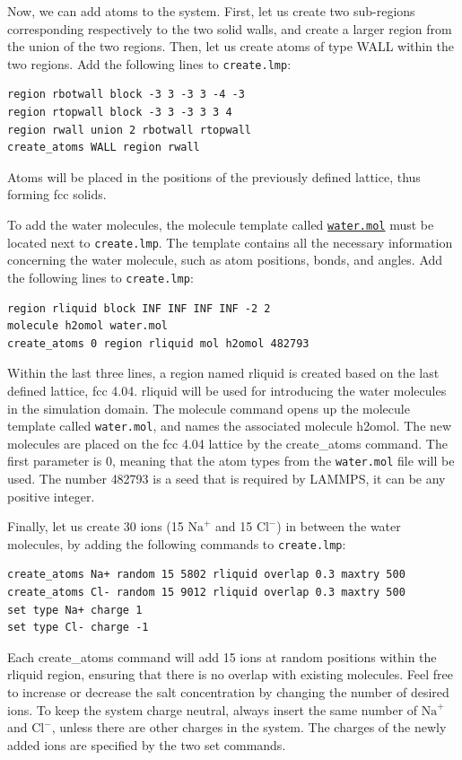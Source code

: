 \documentclass[9pt,tutorial]{livecoms}
\newcommand{\lmpcmd}[1]{\colorbox{listing}{\textcolor{command}{\small{#1}}}} %
\newcommand{\flecmd}[1]{\textcolor{command}{\texttt{#1}}} %
\newcommand{\dwlcmd}[1]{\textcolor{download}{\texttt{#1}}} %
\newcommand{\filepath}{https://raw.githubusercontent.com/lammpstutorials/lammpstutorials-article/main/files/}
\begin{document}
Now, we can add atoms to the system.  First, let us create two sub-regions corresponding
respectively to the two solid walls, and create a larger region from the union of the
two regions.  Then, let us create atoms of type WALL within the two regions.  Add the
following lines to \flecmd{create.lmp}:
\begin{lstlisting}
region rbotwall block -3 3 -3 3 -4 -3
region rtopwall block -3 3 -3 3 3 4
region rwall union 2 rbotwall rtopwall
create_atoms WALL region rwall
\end{lstlisting}
Atoms will be placed in the positions of the previously defined lattice, thus
forming fcc solids.

To add the water molecules, the molecule
template called \href{\filepath tutorial4/water.mol}{\dwlcmd{water.mol}}
must be located next to \flecmd{create.lmp}.  The template contains all the
necessary information concerning the water molecule, such as atom positions,
bonds, and angles.  Add the following lines to \flecmd{create.lmp}:
\begin{lstlisting}
region rliquid block INF INF INF INF -2 2
molecule h2omol water.mol
create_atoms 0 region rliquid mol h2omol 482793
\end{lstlisting}
Within the last three lines, a region named \lmpcmd{rliquid} is
created based on the last defined lattice, \lmpcmd{fcc 4.04}.  \lmpcmd{rliquid}
will be used for introducing the water molecules in the simulation domain.  The \lmpcmd{molecule} command
opens up the molecule template called \flecmd{water.mol}, and names the
associated molecule \lmpcmd{h2omol}.  The new molecules are placed on the
\lmpcmd{fcc 4.04} lattice by the \lmpcmd{create\_atoms} command.  The first
parameter is 0, meaning that the atom types from the \flecmd{water.mol} file
will be used.  The number \lmpcmd{482793} is a seed that is required by LAMMPS,
it can be any positive integer.

Finally, let us create 30 ions (15 $\text{Na}^+$ and 15 $\text{Cl}^-$) in between
the water molecules, by adding the following commands to \flecmd{create.lmp}:
\begin{lstlisting}
create_atoms Na+ random 15 5802 rliquid overlap 0.3 maxtry 500
create_atoms Cl- random 15 9012 rliquid overlap 0.3 maxtry 500
set type Na+ charge 1
set type Cl- charge -1
\end{lstlisting}
Each \lmpcmd{create\_atoms} command will add 15 ions at random positions
within the \lmpcmd{rliquid} region, ensuring that there is no \lmpcmd{overlap}
with existing molecules.  Feel free to increase or decrease the salt concentration
by changing the number of desired ions.  To keep the system charge neutral,
always insert the same number of $\text{Na}^+$ and $\text{Cl}^-$, unless there
are other charges in the system.  The charges of the newly added ions are specified
by the two \lmpcmd{set} commands.
\end{document}
